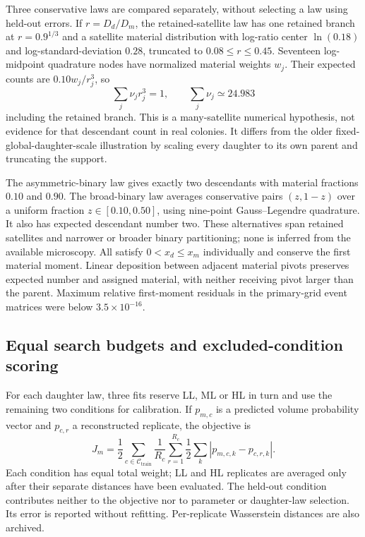 Three conservative laws are compared separately, without selecting a law using held-out errors. If $r=D_d/D_m$, the retained-satellite law has one retained branch at $r=0.9^{1/3}$ and a satellite material distribution with log-ratio center $\ln(0.18)$ and log-standard-deviation $0.28$, truncated to $0.08\leq r\leq0.45$. Seventeen log-midpoint quadrature nodes have normalized material weights $w_j$. Their expected counts are $0.10w_j/r_j^3$, so
\[
 \sum_j \nu_j r_j^3=1,\qquad \sum_j\nu_j\simeq24.983
\]
including the retained branch. This is a many-satellite numerical hypothesis, not evidence for that descendant count in real colonies. It differs from the older fixed-global-daughter-scale illustration by scaling every daughter to its own parent and truncating the support.

The asymmetric-binary law gives exactly two descendants with material fractions $0.10$ and $0.90$. The broad-binary law averages conservative pairs $(z,1-z)$ over a uniform fraction $z\in[0.10,0.50]$, using nine-point Gauss--Legendre quadrature. It also has expected descendant number two. These alternatives span retained satellites and narrower or broader binary partitioning; none is inferred from the available microscopy. All satisfy $0<x_d\leq x_m$ individually and conserve the first material moment. Linear deposition between adjacent material pivots preserves expected number and assigned material, with neither receiving pivot larger than the parent. Maximum relative first-moment residuals in the primary-grid event matrices were below $3.5\times10^{-16}$.

\subsection{Equal search budgets and excluded-condition scoring}

For each daughter law, three fits reserve LL, ML or HL in turn and use the remaining two conditions for calibration. If $p_{m,c}$ is a predicted volume probability vector and $p_{c,r}$ a reconstructed replicate, the objective is
\begin{equation}
 J_m=\frac{1}{2}\sum_{c\in\mathcal C_{\mathrm{train}}}
 \frac{1}{R_c}\sum_{r=1}^{R_c}\frac{1}{2}\sum_k
 |p_{m,c,k}-p_{c,r,k}|.
 \label{eq:matched-objective}
\end{equation}
Each condition has equal total weight; LL and HL replicates are averaged only after their separate distances have been evaluated. The held-out condition contributes neither to the objective nor to parameter or daughter-law selection. Its error is reported without refitting. Per-replicate Wasserstein distances are also archived.

